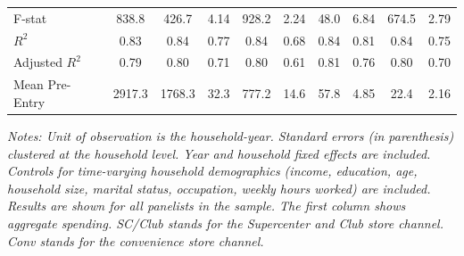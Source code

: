 {{\begin{threeparttable}
\begin{tabular}{l*{9}{c}}
F-stat          &    838.8         &    426.7         &     4.14         &    928.2         &     2.24         &     48.0         &     6.84         &    674.5         &     2.79         \\
\(R^{2}\)       &     0.83         &     0.84         &     0.77         &     0.84         &     0.68         &     0.84         &     0.81         &     0.84         &     0.75         \\
Adjusted \(R^{2}\)&     0.79         &     0.80         &     0.71         &     0.80         &     0.61         &     0.81         &     0.76         &     0.80         &     0.70         \\
Mean Pre-Entry  &   2917.3         &   1768.3         &     32.3         &    777.2         &     14.6         &     57.8         &     4.85         &     22.4         &     2.16         \\
\bottomrule
\end{tabular}
\begin{tablenotes}[flushleft]
\small 
\item \textit{Notes: Unit of observation is the household-year. Standard errors (in parenthesis) clustered at the household level. Year and household fixed effects are included. Controls for time-varying household demographics (income, education, age, household size, marital status, occupation, weekly hours worked) are included. Results are shown for all panelists in the sample. The first column shows aggregate spending. SC/Club stands for the Supercenter and Club store channel. Conv stands for the convenience store channel.}
\end{tablenotes}


\end{threeparttable}}
}
